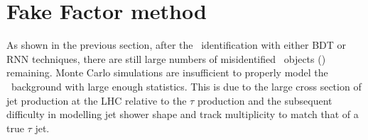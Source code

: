 
	\section{Fake Factor method} \label{sec:ffmeth}
	As shown in the previous section, after the \htau\ identification with either \ac{BDT} or \ac{RNN} techniques, there are still large numbers of misidentified \htau\ objects (\ftau) remaining. 
	Monte Carlo simulations are insufficient to properly model the \ftau\ background with large enough statistics. 
	This is due to the large cross section of jet production at the LHC relative to the $\tau$ production and the subsequent difficulty in modelling jet shower shape and track multiplicity to match that of a true $\tau$ jet.
	
